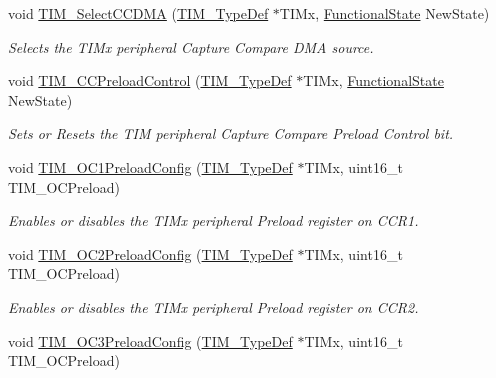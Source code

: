 \begin{DoxyCompactItemize}
void \mbox{\hyperlink{group___t_i_m___exported___functions_ga5273cb65acb885fe7982827b1c6b7d75}{T\+I\+M\+\_\+\+Select\+C\+C\+D\+MA}} (\mbox{\hyperlink{struct_t_i_m___type_def}{T\+I\+M\+\_\+\+Type\+Def}} $\ast$T\+I\+Mx, \mbox{\hyperlink{group___exported__types_gac9a7e9a35d2513ec15c3b537aaa4fba1}{Functional\+State}} New\+State)
\begin{DoxyCompactList}\small\item\em Selects the T\+I\+Mx peripheral Capture Compare D\+MA source. \end{DoxyCompactList}\item 
void \mbox{\hyperlink{group___t_i_m___exported___functions_ga0a935254e44312b1d78e8684a58db3c1}{T\+I\+M\+\_\+\+C\+C\+Preload\+Control}} (\mbox{\hyperlink{struct_t_i_m___type_def}{T\+I\+M\+\_\+\+Type\+Def}} $\ast$T\+I\+Mx, \mbox{\hyperlink{group___exported__types_gac9a7e9a35d2513ec15c3b537aaa4fba1}{Functional\+State}} New\+State)
\begin{DoxyCompactList}\small\item\em Sets or Resets the T\+IM peripheral Capture Compare Preload Control bit. \end{DoxyCompactList}\item 
void \mbox{\hyperlink{group___t_i_m___exported___functions_ga60e6c29ad8f919bef616cf8e3306dd64}{T\+I\+M\+\_\+\+O\+C1\+Preload\+Config}} (\mbox{\hyperlink{struct_t_i_m___type_def}{T\+I\+M\+\_\+\+Type\+Def}} $\ast$T\+I\+Mx, uint16\+\_\+t T\+I\+M\+\_\+\+O\+C\+Preload)
\begin{DoxyCompactList}\small\item\em Enables or disables the T\+I\+Mx peripheral Preload register on C\+C\+R1. \end{DoxyCompactList}\item 
void \mbox{\hyperlink{group___t_i_m___exported___functions_ga75b4614c6dd2cd52f2c5becdb6590c10}{T\+I\+M\+\_\+\+O\+C2\+Preload\+Config}} (\mbox{\hyperlink{struct_t_i_m___type_def}{T\+I\+M\+\_\+\+Type\+Def}} $\ast$T\+I\+Mx, uint16\+\_\+t T\+I\+M\+\_\+\+O\+C\+Preload)
\begin{DoxyCompactList}\small\item\em Enables or disables the T\+I\+Mx peripheral Preload register on C\+C\+R2. \end{DoxyCompactList}\item 
void \mbox{\hyperlink{group___t_i_m___exported___functions_ga8b2391685a519e60e596b7d596f86f09}{T\+I\+M\+\_\+\+O\+C3\+Preload\+Config}} (\mbox{\hyperlink{struct_t_i_m___type_def}{T\+I\+M\+\_\+\+Type\+Def}} $\ast$T\+I\+Mx, uint16\+\_\+t T\+I\+M\+\_\+\+O\+C\+Preload)

\end{DoxyCompactItemize}
